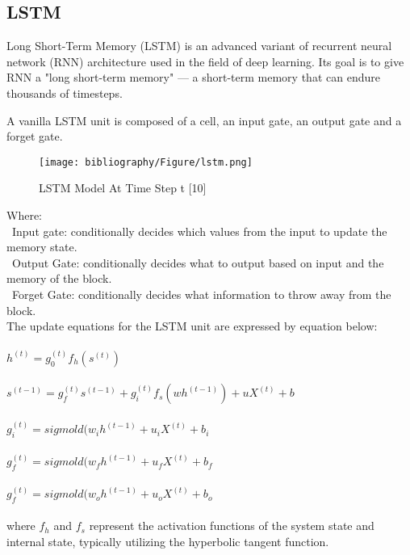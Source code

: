 \documentclass{ieeeojies}
\begin{document}
\subsection{LSTM}
Long Short-Term Memory (LSTM) is an advanced variant of recurrent neural network (RNN) architecture used in the field of deep learning. Its goal is to give RNN a "long short-term memory" — a short-term memory that can endure thousands of timesteps.

A vanilla LSTM unit is composed of a cell, an input gate, an output gate and a forget gate.

\begin{figure}[H]
  \centering
  \begin{minipage}{0.8\linewidth}
    \centering
    \texttt{[image: bibliography/Figure/lstm.png]}
    \caption{LSTM Model At Time Step t [10]}
    \label{fig9}
  \end{minipage}
\end{figure}

Where:\\
\indent\textbullet\ Input gate: conditionally decides which values from the input to update the memory state.\\
\indent\textbullet\ Output Gate: conditionally decides what to output based on input and the memory of the block.\\
\indent\textbullet\ Forget Gate: conditionally decides what information to throw away from the block.\\

The update equations for the LSTM unit are expressed by equation below: \\
\\$h^{(t)} = g_0^{(t)}f_h(s^{(t)})$ \quad[10]\\
\\$s^{(t-1)} = g_f^{(t)}s^{(t-1)} + g_i^{(t)}f_s(wh^{(t-1)}) + uX^{(t)} + b$ \quad[10]\\
\\$g_i^{(t)} = sigmold (w_ih^{(t-1)} + u_iX^{(t)} + b_i$ \quad[10]\\
\\$g_f^{(t)} = sigmold (w_fh^{(t-1)} + u_fX^{(t)} + b_f$ \quad[10]\\
\\$g_f^{(t)} = sigmold (w_oh^{(t-1)} + u_oX^{(t)} + b_o$ \quad[10]\\
\\ where $f_h$ and $f_s$
represent the activation functions of the 
system state and internal state, typically utilizing the 
hyperbolic tangent function.
\end{document}
